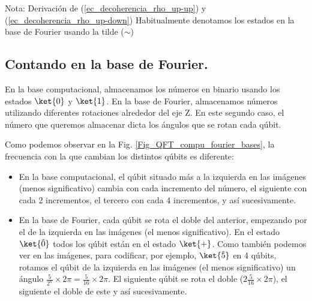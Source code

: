 \documentclass[a4paper,11pt]{book} %
\numberwithin{equation}{chapter}
\begin{document}
\begin{mybox_blue}{Nota: Derivación de (\ref{ec_decoherencia_rho_up-up}) y  (\ref{ec_decoherencia_rho_up-down})}
Habitualmente denotamos los estados en la base de Fourier usando la tilde ($\sim$)

		\subsection{Contando en la base de Fourier.}

En la base computacional, almacenamos los números en binario usando los estados $\ket{0}$ y $\ket{1}$. En la base de Fourier, almacenamos números utilizando diferentes rotaciones alrededor del eje Z. En este segundo caso, el número que queremos almacenar dicta los ángulos que se rotan cada qúbit. 

Como podemos observar en la Fig. \ref{Fig_QFT_compu_fourier_bases}, 
la frecuencia con la que cambian los distintos qúbits es diferente:
\begin{itemize}
	\item En la base computacional, el qúbit situado más a la izquierda en las imágenes (menos significativo) cambia con cada incremento del número, el siguiente con cada 2 incrementos, el tercero con cada 4 incrementos, y así sucesivamente.
	\item En la base de Fourier, cada qúbit se rota el doble del anterior, empezando por el de la izquierda en las imágenes (el menos significativo). En el estado $\ket{\tilde{0}}$ todos los qúbit están en el estado $\ket{+}$. Como también podemos ver en las imágenes, para codificar, por ejemplo, $\ket{\tilde{5}}$ en 4 qúbits, rotamos el qúbit de la izquierda en las imágenes (el menos significativo) un ángulo $\frac{5}{2^n} \times 2 \pi = \frac{5}{16} \times 2 \pi $. El siguiente qúbit se rota el doble ($2 \frac{5}{16} \times 2 \pi$), el siguiente el doble de este y así sucesivamente.
\end{itemize}


\end{mybox_blue}
\end{document}
